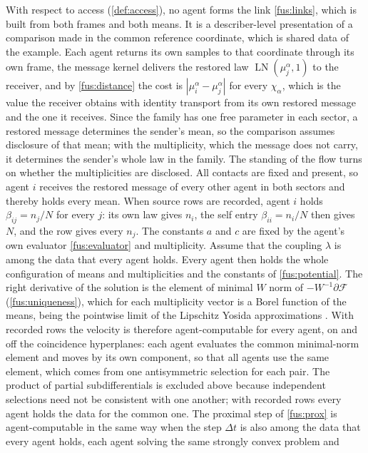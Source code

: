 With respect to access (\cref{def:access}), no agent forms the link
\cref{fus:links}, which is built from both frames and both means. It is a
describer-level presentation of a comparison made in the common reference
coordinate, which is shared data of the example. Each agent returns its own
samples to that coordinate through its own frame, the message kernel
delivers the restored law $\operatorname{LN}(\mu_j^\alpha,1)$ to the
receiver, and by \cref{fus:distance} the cost is
$|\mu_i^\alpha-\mu_j^\alpha|$ for every $\chi_\alpha$, which is the value
the receiver obtains with identity transport from its own restored message
and the one it receives. Since the family has one free parameter in each
sector, a restored message determines the sender's mean, so the comparison
assumes disclosure of that mean; with the multiplicity, which the message does not
carry, it determines the sender's whole law in the family. The standing of
the flow turns on whether the multiplicities are disclosed. All contacts are
fixed and present, so agent $i$ receives the restored message of every other
agent in both sectors and thereby holds every mean. When source rows are
recorded, agent $i$ holds $\beta_{ij}=n_j/N$ for every $j$: its own law
gives $n_i$, the self entry $\beta_{ii}=n_i/N$ then gives $N$, and the row
gives every $n_j$. The constants $a$ and $c$ are fixed by the agent's own
evaluator \cref{fus:evaluator} and multiplicity. Assume that the coupling
$\lambda$ is among the data that every agent holds. Every agent then holds
the whole configuration of means and multiplicities and the constants of
\cref{fus:potential}. The right derivative of the solution is the element of minimal $W$ norm of
$-W^{-1}\partial\mathcal F$ (\cref{fus:uniqueness}), which for each
multiplicity vector is a Borel function of the means, being the pointwise
limit of the Lipschitz Yosida approximations \cite{Brezis1973}. With
recorded rows the velocity is therefore agent-computable for every agent, on
and off the coincidence hyperplanes: each agent evaluates the common
minimal-norm element and moves by its own component, so that all agents use
the same element, which comes from one antisymmetric selection for each
pair. The product of partial subdifferentials is excluded above because
independent selections need not be consistent with one another; with
recorded rows every agent holds the data for the common one. The proximal
step of \cref{fus:prox} is agent-computable
in the same way when the step $\Delta t$ is also among the data that every
agent holds, each agent solving the same strongly convex problem and

